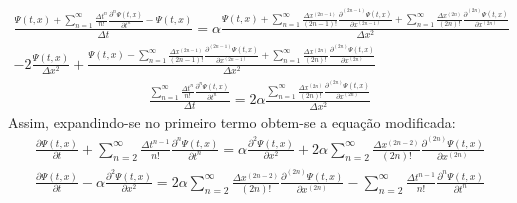 \documentclass[10pt,twoside,a4paper]{article}
\begin{document}
\begin{equation} \label{difusao_discretizada_modificada}
\begin{split}
\frac{\Psi (t , x) + \sum\limits_{n=1}^{\infty} \frac{\Delta t^{n}}{n!} \frac{\partial^{n} \Psi (t , x)}{\partial t^{n}} - \Psi (t , x)}{\Delta t} 
=
\alpha \frac{
	\Psi \left(t, x\right)
	+\sum\limits_{n=1}^{\infty} \frac{\Delta x^{\left(2n-1\right)}}{\left(2n-1\right)!} \frac{\partial^{\left(2n-1\right)} \Psi \left(t, x\right)}{\partial x^{\left(2n-1\right)}}
	+\sum\limits_{n=1}^{\infty} \frac{\Delta x^{\left(2n\right)}}{\left(2n\right)!} \frac{\partial^{\left(2n\right)} \Psi \left(t, x\right)}{\partial x^{\left(2n\right)}}
			}{\Delta x ^ 2} \\
-2 \frac{
	\Psi (t , x)
		}{\Delta x ^ 2} + 
\frac{
	\Psi \left(t, x\right) 
	-\sum\limits_{n=1}^{\infty} \frac{\Delta x^{\left(2n-1\right)}}{\left(2n-1\right)!} \frac{\partial^{\left(2n-1\right)} \Psi \left(t, x\right)}{\partial x^{\left(2n-1\right)}}
	+\sum\limits_{n=1}^{\infty} \frac{\Delta x^{\left(2n\right)}}{\left(2n\right)!} \frac{\partial^{\left(2n\right)} \Psi \left(t, x\right)}{\partial x^{\left(2n\right)}}
		}{\Delta x ^ 2}
\end{split}
\end{equation}
\begin{equation}
\begin{split}
\frac{ \sum\limits_{n=1}^{\infty} \frac{\Delta t^{n}}{n!} \frac{\partial^{n} \Psi (t , x)}{\partial t^{n}}}{\Delta t} 
=
2 \alpha \frac{
	\sum\limits_{n=1}^{\infty} \frac{\Delta x^{\left(2n\right)}}{\left(2n\right)!} \frac{\partial^{\left(2n\right)} \Psi \left(t, x\right)}{\partial x^{\left(2n\right)}}
}{\Delta x ^ 2}
\end{split}
\end{equation}
Assim, expandindo-se no primeiro termo obtem-se a equação modificada:
\begin{equation}
\begin{split}
 \frac{\partial \Psi \left(t, x\right) }{\partial t}   + \sum\limits_{n=2}^{\infty} \frac{\Delta t^{n - 1}}{n!} \frac{\partial^{n} \Psi (t , x)}{\partial t^{n}}
= 
\alpha \frac{\partial^2 \Psi \left(t, x\right) }{\partial x^2} +
2 \alpha \sum\limits_{n=2}^{\infty} \frac{\Delta x^{\left(2n - 2\right)}}{\left(2n\right)!} \frac{\partial^{\left(2n\right)} \Psi \left(t, x\right)}{\partial x^{\left(2n\right)}}	
\end{split}
\end{equation}
\begin{equation}\label{olalaaa}
\begin{split}
\frac{\partial \Psi \left(t, x\right) }{\partial t} -
\alpha \frac{\partial^2 \Psi \left(t, x\right) }{\partial x^2} 
= 
2 \alpha \sum\limits_{n=2}^{\infty} \frac{\Delta x^{\left(2n - 2\right)}}{\left(2n\right)!} \frac{\partial^{\left(2n\right)} \Psi \left(t, x\right)}{\partial x^{\left(2n\right)}}
- \sum\limits_{n=2}^{\infty} \frac{\Delta t^{n - 1}}{n!} \frac{\partial^{n} \Psi (t , x)}{\partial t^{n}}	
\end{split}
\end{equation}
\end{document}
